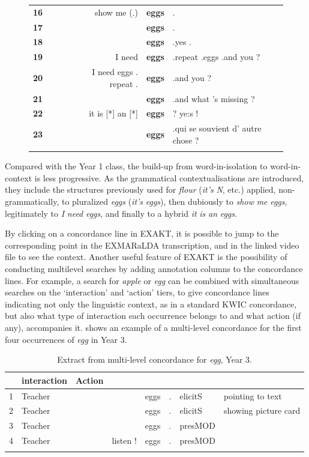 \documentclass[output=paper,colorlinks,citecolor=brown,modfonts,nonflat]{../langscibook}
\begin{document}
\begin{figure}
\begin{tabular}{l@{}l@{}lr@{~}l@{~}l}
 \textbf{16} &  &  &  show me (.) & \textbf{eggs} & .\\
 \textbf{17} &  &  &  & \textbf{eggs} & .\\
 \textbf{18} &  &  &  & \textbf{eggs} & .yes .\\
 \textbf{19} &  &  &  I need & \textbf{eggs} & .repeat .eggs .and you ?\\
 \textbf{20} &  &  &  I need eggs . repeat . & \textbf{eggs} & .and you ?\\
 \textbf{21} &  &  &  & \textbf{eggs} & .and what 's missing ?\\
 \textbf{22} &  &  &  it is [*] an [*] & \textbf{eggs} & ? ye:s !\\
 \textbf{23} &  &  &  & \textbf{eggs} & .qui se souvient d' autre chose ?\\
\lspbottomrule
\end{tabular}
\end{figure}

Compared with the Year 1 class, the build-up from word-in-isolation to word-in-context is less progressive. As the grammatical contextualisations are introduced, they include the structures previously used for \textit{flour} (\textit{it’s} \textit{N}, etc.) applied, non-grammatically, to pluralized \textit{eggs} (\textit{it’s} \textit{eggs}), then dubiously to \textit{show} \textit{me} \textit{eggs}, legitimately to \textit{I} \textit{need} \textit{eggs}, and finally to a hybrid \textit{it} \textit{is} \textit{an} \textit{eggs}.

By clicking on a concordance line in EXAKT, it is possible to jump to the corresponding point in the EXMARaLDA transcription, and in the linked video file to see the context. Another useful feature of EXAKT is the possibility of conducting multilevel searches by adding annotation columns to the concordance lines. For example, a search for \textit{apple} or \textit{egg} can be combined with simultaneous searches on the ‘interaction’ and ‘action’ tiers, to give concordance lines indicating not only the linguistic context, as in a standard KWIC concordance, but also what type of interaction each occurrence belongs to and what action (if any), accompanies it.  shows an example of a multi-level concordance for the first four occurrences of \textit{egg} in Year 3.

\begin{table}
\caption{Extract from multi-level concordance for  {\textit{egg}},  {Year}  {3.}\label{tab:hilton:5}}
\begin{tabularx}{\textwidth}{llllllXl}
\lsptoprule
\multicolumn{6}{c}{KWIC concordance} &  interaction &  Action\\
\midrule
1 & Teacher &  &  & eggs & . & elicitS & pointing to text \\
2 & Teacher &  &  & eggs & . & elicitS & showing picture card \\
3 & Teacher &  &  & eggs & . & presMOD & \\
4 & Teacher &  & listen ! & eggs & . & presMOD & \\
\lspbottomrule
\end{tabularx}
\end{table}
\end{document}
